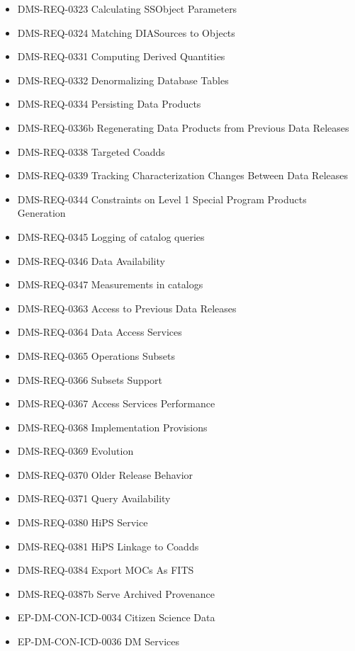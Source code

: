 \begin{itemize}
\item DMS-REQ-0323 Calculating SSObject Parameters
\item DMS-REQ-0324 Matching DIASources to Objects
\item DMS-REQ-0331 Computing Derived Quantities
\item DMS-REQ-0332 Denormalizing Database Tables
\item DMS-REQ-0334 Persisting Data Products
\item DMS-REQ-0336b Regenerating Data Products from Previous Data Releases
\item DMS-REQ-0338 Targeted Coadds
\item DMS-REQ-0339 Tracking Characterization Changes Between Data Releases
\item DMS-REQ-0344 Constraints on Level 1 Special Program Products Generation
\item DMS-REQ-0345 Logging of catalog queries
\item DMS-REQ-0346 Data Availability
\item DMS-REQ-0347 Measurements in catalogs
\item DMS-REQ-0363 Access to Previous Data Releases
\item DMS-REQ-0364 Data Access Services
\item DMS-REQ-0365 Operations Subsets
\item DMS-REQ-0366 Subsets Support
\item DMS-REQ-0367 Access Services Performance
\item DMS-REQ-0368 Implementation Provisions
\item DMS-REQ-0369 Evolution
\item DMS-REQ-0370 Older Release Behavior
\item DMS-REQ-0371 Query Availability
\item DMS-REQ-0380 HiPS Service
\item DMS-REQ-0381 HiPS Linkage to Coadds
\item DMS-REQ-0384 Export MOCs As FITS
\item DMS-REQ-0387b Serve Archived Provenance
\item EP-DM-CON-ICD-0034 Citizen Science Data
\item EP-DM-CON-ICD-0036 DM Services
\end{itemize}
